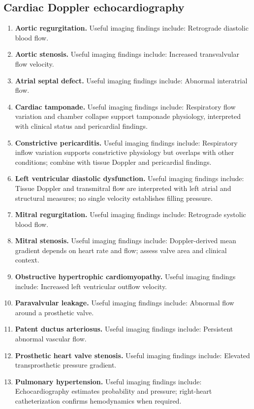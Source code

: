 \subsection{Cardiac Doppler echocardiography}
\begin{enumerate}[leftmargin=*,itemsep=0.45em,topsep=0.4em]
\item \textbf{Aortic regurgitation.} Useful imaging findings include: Retrograde diastolic blood flow.
\item \textbf{Aortic stenosis.} Useful imaging findings include: Increased transvalvular flow velocity.
\item \textbf{Atrial septal defect.} Useful imaging findings include: Abnormal interatrial flow.
\item \textbf{Cardiac tamponade.} Useful imaging findings include: Respiratory flow variation and chamber collapse support tamponade physiology, interpreted with clinical status and pericardial findings.
\item \textbf{Constrictive pericarditis.} Useful imaging findings include: Respiratory inflow variation supports constrictive physiology but overlaps with other conditions; combine with tissue Doppler and pericardial findings.
\item \textbf{Left ventricular diastolic dysfunction.} Useful imaging findings include: Tissue Doppler and transmitral flow are interpreted with left atrial and structural measures; no single velocity establishes filling pressure.
\item \textbf{Mitral regurgitation.} Useful imaging findings include: Retrograde systolic blood flow.
\item \textbf{Mitral stenosis.} Useful imaging findings include: Doppler-derived mean gradient depends on heart rate and flow; assess valve area and clinical context.
\item \textbf{Obstructive hypertrophic cardiomyopathy.} Useful imaging findings include: Increased left ventricular outflow velocity.
\item \textbf{Paravalvular leakage.} Useful imaging findings include: Abnormal flow around a prosthetic valve.
\item \textbf{Patent ductus arteriosus.} Useful imaging findings include: Persistent abnormal vascular flow.
\item \textbf{Prosthetic heart valve stenosis.} Useful imaging findings include: Elevated transprosthetic pressure gradient.
\item \textbf{Pulmonary hypertension.} Useful imaging findings include: Echocardiography estimates probability and pressure; right-heart catheterization confirms hemodynamics when required.

\end{enumerate}
